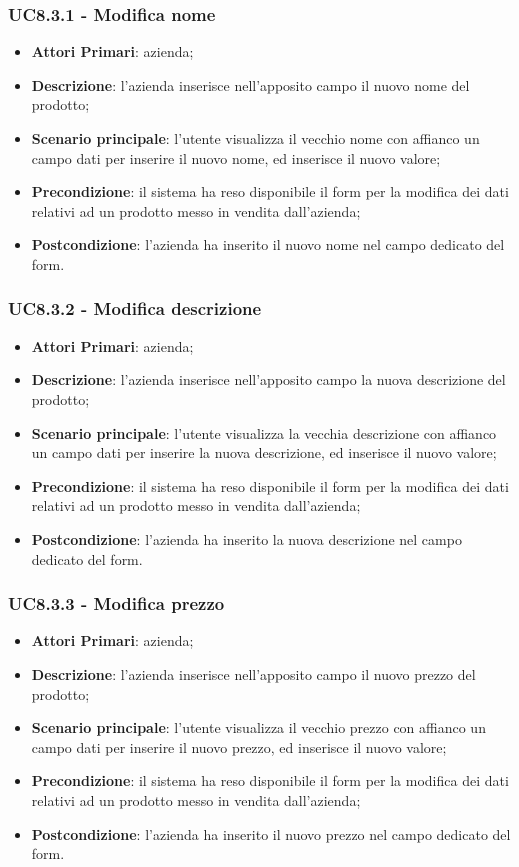 \subsubsection{UC8.3.1 - Modifica nome}
\begin{itemize}
	\item \textbf{Attori Primari}: azienda;
	\item \textbf{Descrizione}: l'azienda inserisce nell'apposito campo il nuovo nome del prodotto;
	\item \textbf{Scenario principale}: l'utente visualizza il vecchio nome con affianco un campo dati per inserire il nuovo nome, ed inserisce il nuovo valore;
	\item \textbf{Precondizione}: il sistema ha reso disponibile il form per la modifica dei dati relativi ad un prodotto messo in vendita dall'azienda;
	\item \textbf{Postcondizione}: l'azienda ha inserito il nuovo nome nel campo dedicato del form.
\end{itemize}

\subsubsection{UC8.3.2 - Modifica descrizione}
\begin{itemize}
	\item \textbf{Attori Primari}: azienda;
	\item \textbf{Descrizione}: l'azienda inserisce nell'apposito campo la nuova descrizione del prodotto;
	\item \textbf{Scenario principale}: l'utente visualizza la vecchia descrizione con affianco un campo dati per inserire la nuova descrizione, ed inserisce il nuovo valore;
	\item \textbf{Precondizione}: il sistema ha reso disponibile il form per la modifica dei dati relativi ad un prodotto messo in vendita dall'azienda;
	\item \textbf{Postcondizione}: l'azienda ha inserito la nuova descrizione nel campo dedicato del form.
\end{itemize}

\subsubsection{UC8.3.3 - Modifica prezzo}
\begin{itemize}
	\item \textbf{Attori Primari}: azienda;
	\item \textbf{Descrizione}: l'azienda inserisce nell'apposito campo il nuovo prezzo del prodotto;
	\item \textbf{Scenario principale}: l'utente visualizza il vecchio prezzo con affianco un campo dati per inserire il nuovo prezzo, ed inserisce il nuovo valore;
	\item \textbf{Precondizione}: il sistema ha reso disponibile il form per la modifica dei dati relativi ad un prodotto messo in vendita dall'azienda;
	\item \textbf{Postcondizione}: l'azienda ha inserito il nuovo prezzo nel campo dedicato del form.
\end{itemize}

